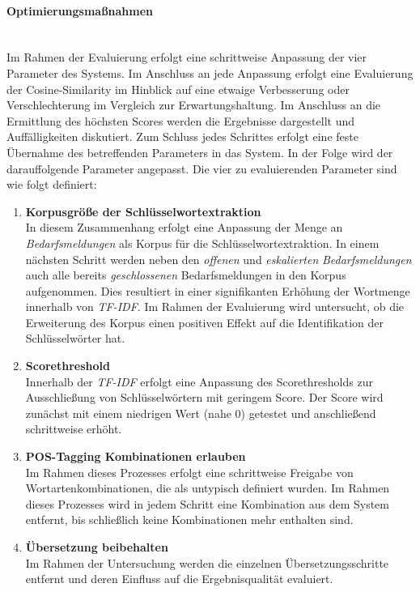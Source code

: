 \paragraph{Optimierungsmaßnahmen}\label{sec:optimierungsmaßnahmen}\mbox{}\\
Im Rahmen der Evaluierung erfolgt eine schrittweise Anpassung der vier Parameter des Systems. Im Anschluss an jede Anpassung erfolgt eine Evaluierung der Cosine-Similarity im Hinblick auf eine etwaige Verbesserung oder Verschlechterung im Vergleich zur Erwartungshaltung. Im Anschluss an die Ermittlung des höchsten Scores werden die Ergebnisse dargestellt und Auffälligkeiten diskutiert. Zum Schluss jedes Schrittes erfolgt eine feste Übernahme des betreffenden Parameters in das System. In der Folge wird der darauffolgende Parameter angepasst. Die vier zu evaluierenden Parameter sind wie folgt definiert:
\begin{enumerate}
	\item \textbf{Korpusgröße der Schlüsselwortextraktion} \\ In diesem Zusammenhang erfolgt eine Anpassung der Menge an \emph{Bedarfsmeldungen} als Korpus für die Schlüsselwortextraktion. In einem nächsten Schritt werden neben den \emph{offenen} und \emph{eskalierten} \emph{Bedarfsmeldungen} auch alle bereits \emph{geschlossenen} Bedarfsmeldungen in den Korpus aufgenommen. Dies resultiert in einer signifikanten Erhöhung der Wortmenge innerhalb von \emph{TF-IDF}. Im Rahmen der Evaluierung wird untersucht, ob die Erweiterung des Korpus einen positiven Effekt auf die Identifikation der Schlüsselwörter hat.
	\item \textbf{Scorethreshold} \\ Innerhalb der \emph{TF-IDF} erfolgt eine Anpassung des Scorethresholds zur Ausschließung von Schlüsselwörtern mit geringem Score. Der Score wird zunächst mit einem niedrigen Wert (nahe 0) getestet und anschließend schrittweise erhöht.
	\item \textbf{POS-Tagging Kombinationen erlauben} \\ Im Rahmen dieses Prozesses erfolgt eine schrittweise Freigabe von Wortartenkombinationen, die als untypisch definiert wurden. Im Rahmen dieses Prozesses wird in jedem Schritt eine Kombination aus dem System entfernt, bis schließlich keine Kombinationen mehr enthalten sind.
	\item \textbf{Übersetzung beibehalten} \\ Im Rahmen der Untersuchung werden die einzelnen Übersetzungsschritte entfernt und deren Einfluss auf die Ergebnisqualität evaluiert.
\end{enumerate}
